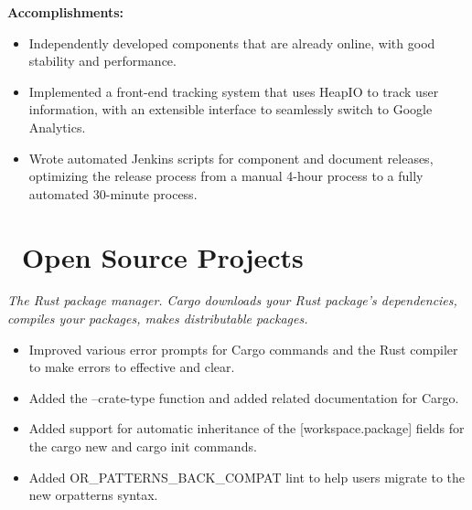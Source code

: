 \documentclass{resume}
\newcommand{\en}[1]{#1}
\newcommand{\zh}[1]{}
\begin{document}
\en{\textbf{Accomplishments:}}
\zh{\textbf{产出：}}
\begin{itemize}
      \item \en{Independently developed components that are already online, with good stability and performance.}
            \zh{多个独立开发的组件已经上线使用，有较好的稳定性和性能。}
      \item \en{Implemented a front-end tracking system that uses HeapIO to track user information, with an extensible interface to seamlessly switch to Google Analytics.}
            \zh{实现了前端的 tracking 系统，使用 HeapIO 追踪用户信息，并预留可扩展接口，可无缝切换至 Google Analytics。}
      \item \en{Wrote automated Jenkins scripts for component and document releases, optimizing the release process from a manual 4-hour process to a fully automated 30-minute process.}
            \zh{为组件和文档发布编写了自动化 Jenkins 脚本，将发布流程从手动 4 小时优化到全自动 30 分钟。}
\end{itemize}

\section{\faGithubAlt\ \en{Open Source Projects}\zh{开源项目}}
\en{}
\zh{\datedsubsection{\textbf{Cargo \& Rust - 活跃贡献者}}{{\href{https://github.com/search?q=repo:rust-lang/cargo+repo:rust-lang/rust+author:hi-rustin&type=commits}{219+ commits}}}}
\en{\textsl{The Rust package manager. Cargo downloads your Rust package’s dependencies, compiles your packages, makes distributable packages.}}
\zh{\textsl{Rust 包管理器，Cargo 下载 Rust 包的依赖，编译包，制作可分发的包。}}

\begin{itemize}
      \item \en{Improved various error prompts for Cargo commands and the Rust compiler to make errors to effective and clear.}
            \zh{改善了大量 Cargo 命令和 Rust 编译器的错误提示，让错误更有效更清晰。}
      \item \en{Added the --crate-type function and added related documentation for Cargo.}
            \zh{为 Cargo 添加了 --crate-type 功能和相关文档。}
      \item \en{Added support for automatic inheritance of the [workspace.package] fields for the cargo new and cargo init commands.}
            \zh{为 cargo new 和 cargo init 命令支持了 [workspace.package] 字段自动继承。}
      \item \en{Added OR\_PATTERNS\_BACK\_COMPAT lint to help users migrate to the new or\-patterns syntax.}
            \zh{添加了 OR\_PATTERNS\_BACK\_COMPAT lint 来帮助用户迁移至新的 or\-patterns 语法。}
\end{itemize}
\end{document}
